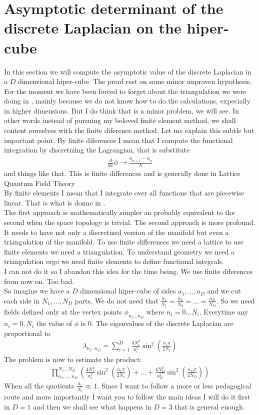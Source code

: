 \documentclass[12pt]{article}
\begin{document}
\section{Asymptotic determinant of the discrete Laplacian on the hiper-cube}
In this section we will compute the asymptotic value of the discrete Laplacian in a $D$ dimensional hiper-cube. The proof rest on some minor unproven hypothesis.\\
For the moment we have been forced to forget about the triangulation we were doing in \cite{informe3}, mainly because we do not know how to do the calculations, expecially in higher dimensions. But I do think that is a minor problem, we will see. In other words instead of pursuing my beloved finite element method, we shall content ourselves with the finite diference method. Let me explain this subtle but important point. By finite diferences I mean that I compute the functional integration by discretizing the Lagrangian, that is substitute
\begin{gather}
\frac{d}{dx}\phi\rightarrow \frac{\phi_{n+1}-\phi_n}{h}
\end{gather}
and things like that. This is finite differences and is generally done in Lattice Quantum Field Theory\\
By finite elements I mean that I integrate over all functions that are piecewise linear. That is what is donne in \cite{informe3}.\\
The first approach is mathematically simpler an probably equivalent to the second when the space topology is trivial. The second approach is more profound. It needs to have not only a discretized version of the manifold but even a triangulation of the manifold. To use finite differences we need a lattice to use finite elements we need a triangulation. To understand geometry we need a triangulation ergo we need finite elements to define functional integrals.\\
I can not do it so I abandon this idea for the time being. We use finite diferences from now on. Too bad.\\
So imagine we have a $D$ dimensional hiper-cube of sides $a_1,...,a_D$ and we cut each side in $N_1,...,N_D$ parts. We do not need that $\frac{a_1}{N_1}=\frac{a_2}{N_2}=...=\frac{a_D}{N_D}$. So we need fields defined only at the vertex points $\phi_{n_1...n_D}$ where $n_i=0...N_i$. Everytime any $n_i=0,N_i$ the value of $\phi$ is $0$. The eigenvalues of the discrete Laplacian are proportional to
\begin{gather}
\lambda_{n_1..n_D}=\sum_{i=1}^D\frac{4N_i^2}{a_i^2}\sin^2\left(\frac{n_i\pi}{2N_i}\right)
\end{gather}
The problem is now to estimate the product:
\begin{gather}
\prod_{n_1,...,n_D}^{N_1...N_D}\left(\frac{4N_1^2}{a_1^2}\sin^2\left(\frac{n_1\pi}{2N_1}\right)+...
+\frac{4N_D^2}{a_D^2}\sin^2\left(\frac{n_D\pi}{2N_D}\right)\right)
\end{gather}
When all the quotients $\frac{a_i}{N_i}\ll 1$. Since I want to follow a more or less pedagogical route and more importantly I want you to follow the main ideas I will do it first in $D=1$ and then we shall see what happens in $D=3$ that is general enough.
\end{document}
